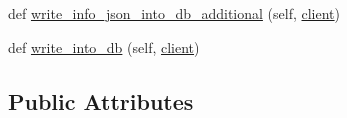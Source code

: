 \begin{DoxyCompactItemize}
\item 
def \hyperlink{classButton__Masher__Application__Output_1_1Button__Masher__Application__node__listener_af1481d5ed69bf66fb8f4356694ae23b9}{write\+\_\+info\+\_\+json\+\_\+into\+\_\+db\+\_\+additional} (self, \hyperlink{classButton__Masher__Application__Output_1_1Button__Masher__Application__node__listener_ad5bc32b75da65fe60067f501a4bb6665}{client})
\item 
def \hyperlink{classButton__Masher__Application__Output_1_1Button__Masher__Application__node__listener_aa073b1c8f4b4c6517f35ade17ed85dd6}{write\+\_\+into\+\_\+db} (self, \hyperlink{classButton__Masher__Application__Output_1_1Button__Masher__Application__node__listener_ad5bc32b75da65fe60067f501a4bb6665}{client})
\end{DoxyCompactItemize}
\subsection*{Public Attributes}
